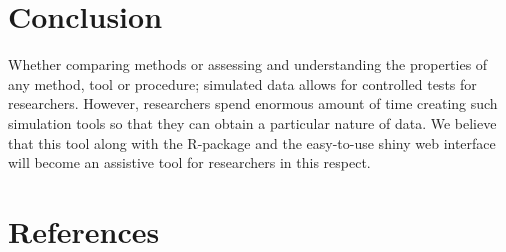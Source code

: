 \documentclass[review]{elsarticle}
\theoremstyle{definition}
\theoremstyle{definition}
\theoremstyle{definition}
\theoremstyle{remark}
\begin{document}
\section{Conclusion}\label{conclusion}

Whether comparing methods or assessing and understanding the properties
of any method, tool or procedure; simulated data allows for controlled
tests for researchers. However, researchers spend enormous amount of
time creating such simulation tools so that they can obtain a particular
nature of data. We believe that this tool along with the R-package and
the easy-to-use shiny web interface will become an assistive tool for
researchers in this respect.

\section{References}\label{references}


\renewcommand\refname{References}

\end{document}
